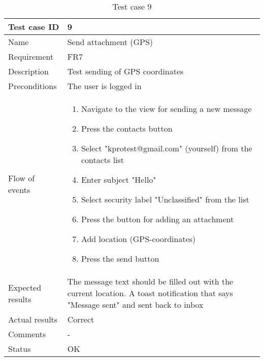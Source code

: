 		\begin{table}[htb]
			\begin{tabular}{l|p{10cm}}
				Test case ID & 9 \\ \hline
				Name & Send attachment (GPS)\\ \hline
				Requirement & FR7\\ \hline
				Description & Test sending of GPS coordinates\\ \hline
				Preconditions & The user is logged in\\ \hline
				Flow of events & 
					\begin{enumerate}
						\item{}Navigate to the view for sending a new message
						\item{}Press the contacts button
						\item{}Select "kprotest@gmail.com" (yourself) from the contacts list
						\item{}Enter subject "Hello"
						\item{}Select security label "Unclassified" from the list
						\item{}Press the button for adding an attachment
						\item{}Add location (GPS-coordinates)
						\item{}Press the send button
					\end{enumerate} \\ \hline
				Expected results & The message text should be filled out with the current location. A toast notification that says "Message sent" and sent back to inbox\\ \hline
				Actual results &Correct\\ \hline
				Comments &-\\ \hline
				Status &OK\\ \hline
			\end{tabular}
			\caption{Test case 9} \label{tab:case9}
		\end{table}

